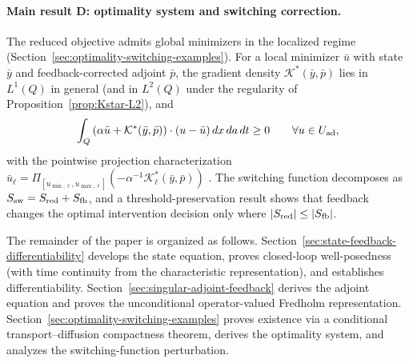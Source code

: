 \documentclass[pdflatex,sn-mathphys-num]{sn-jnl}
\theoremstyle{plain}
\theoremstyle{definition}
\theoremstyle{remark}
\begin{document}
\paragraph{Main result D: optimality system and switching correction.}
The reduced objective admits global minimizers in the localized regime
(Section~\ref{sec:optimality-switching-examples}). For a local minimizer
$\bar u$ with state $\bar y$ and feedback-corrected adjoint $\bar p$, the
gradient density $\mathcal K^*(\bar y,\bar p)$ lies in $L^1(Q)$ in general
(and in $L^2(Q)$ under the regularity of
Proposition~\ref{prop:Kstar-L2}), and
\[
\int_Q
\left(
\alpha\bar u+\mathcal K^*(\bar y,\bar p)
\right)\cdot
(u-\bar u)
\,dx\,da\,dt
\ge0
\qquad
\forall u\in U_{\rm ad},
\]
with the pointwise projection characterization
$\bar u_\ell=\Pi_{[u_{\min,\ell},u_{\max,\ell}]}(-\alpha^{-1}
\mathcal K_\ell^*(\bar y,\bar p))$ \cite{troltzsch2010optimal,yu2026beyond,hinze2008optimization}. The switching
function decomposes as $S_{\rm sw}=S_{\rm red}+S_{\rm fb}$, and a
threshold-preservation result shows that feedback changes the optimal
intervention decision only where $|S_{\rm red}|\le|S_{\rm fb}|$.

The remainder of the paper is organized as follows.
Section~\ref{sec:state-feedback-differentiability} develops the state
equation, proves closed-loop well-posedness (with time continuity from the
characteristic representation), and establishes differentiability.
Section~\ref{sec:singular-adjoint-feedback} derives the adjoint equation and
proves the unconditional operator-valued Fredholm representation.
Section~\ref{sec:optimality-switching-examples} proves existence via a conditional
transport--diffusion compactness theorem, derives the optimality system, and
analyzes the switching-function perturbation.
\end{document}
